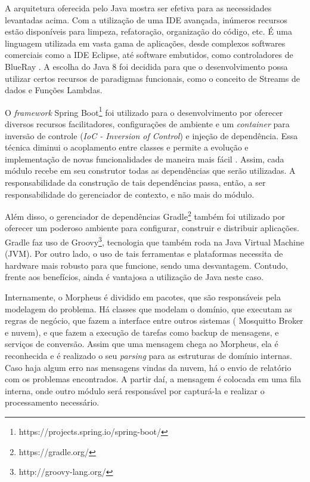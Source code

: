 A arquitetura oferecida pelo Java mostra ser efetiva para as necessidades levantadas acima. Com a utilização de uma IDE avançada, inúmeros recursos estão disponíveis para limpeza, refatoração, organização do código, etc. É uma linguagem utilizada em vasta gama de aplicações, desde complexos softwares comerciais como a IDE Eclipse, até software embutidos, como controladores de BlueRay \cite{javaBlueray}. A escolha do Java 8 foi decidida para que o desenvolvimento possa utilizar certos recursos de paradigmas funcionais, como o conceito de Streams de dados e Funções Lambdas.

O \emph{framework} Spring Boot\footnote{https://projects.spring.io/spring-boot/} foi utilizado para o desenvolvimento por oferecer diversos recursos facilitadores, configurações de ambiente e um \emph{container} para inversão de controle (\emph{IoC - Inversion of Control}) e injeção de dependência. Essa técnica diminui o acoplamento entre classes e permite a evolução e implementação de novas funcionalidades de maneira mais fácil \cite{iocFowler}. Assim, cada módulo recebe em seu construtor todas as dependências que serão utilizadas. A responsabilidade da construção de tais dependências passa, então, a ser responsabilidade do gerenciador de contexto, e não mais do módulo.

Além disso, o gerenciador de dependências Gradle\footnote{https://gradle.org/} também foi utilizado por oferecer um poderoso ambiente para configurar, construir e distribuir aplicações. Gradle faz uso de Groovy\footnote{http://groovy-lang.org/}, tecnologia que também roda na Java Virtual Machine (JVM). Por outro lado, o uso de tais ferramentas e plataformas necessita de hardware mais robusto para que funcione, sendo uma desvantagem. Contudo, frente aos benefícios, ainda é vantajosa a utilização de Java neste caso.

Internamente, o Morpheus é dividido em pacotes, que são responsáveis pela modelagem do problema. Há classes que modelam o domínio, que executam as regras de negócio, que fazem a interface entre outros sistemas (\wmqtt{} Mosquitto Broker e nuvem), e que fazem a execução de tarefas como backup de mensagens, e serviços de conversão.
Assim que uma mensagem chega ao Morpheus, ela é reconhecida e é realizado o seu \emph{parsing} para as estruturas de domínio internas. Caso haja algum erro nas mensagens vindas da nuvem, há o envio de relatório com os problemas encontrados. A partir daí, a mensagem é colocada em uma fila interna, onde outro módulo será responsável por capturá-la e realizar o processamento necessário.

